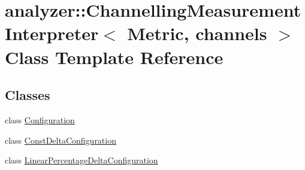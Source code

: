 \hypertarget{classanalyzer_1_1_channelling_measurement_interpreter}{}\section{analyzer\+::Channelling\+Measurement\+Interpreter$<$ Metric, channels $>$ Class Template Reference}
\label{classanalyzer_1_1_channelling_measurement_interpreter}
\subsection*{Classes}
\begin{DoxyCompactItemize}
\item 
class \mbox{\hyperlink{classanalyzer_1_1_channelling_measurement_interpreter_1_1_configuration}{Configuration}}
\item 
class \mbox{\hyperlink{classanalyzer_1_1_channelling_measurement_interpreter_1_1_const_delta_configuration}{Const\+Delta\+Configuration}}
\item 
class \mbox{\hyperlink{classanalyzer_1_1_channelling_measurement_interpreter_1_1_linear_percentage_delta_configuration}{Linear\+Percentage\+Delta\+Configuration}}
\end{DoxyCompactItemize}
